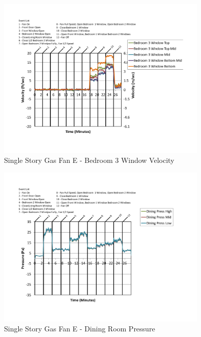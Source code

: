 \documentclass{article}
\begin{document}
\begin{appendices}
	\begin{figure}[H]
		\centering
		\includegraphics[height=3.05in,trim=0.67in 1.1in 0.67in 0.8in,clip=true]{0_Images/Results_Charts/ColdFlow/Single_Story/Gas/E/Bedroom_3_Window_Velocity.pdf}
		\caption{Single Story Gas Fan E - Bedroom 3 Window Velocity}
	\end{figure}
 

	\begin{figure}[H]
		\centering
		\includegraphics[height=3.05in,trim=0.67in 1.1in 0.67in 0.8in,clip=true]{0_Images/Results_Charts/ColdFlow/Single_Story/Gas/E/Dining_Room_Pressure.pdf}
		\caption{Single Story Gas Fan E - Dining Room Pressure}
	\end{figure}
 
	\clearpage


\end{appendices}
\end{document}
